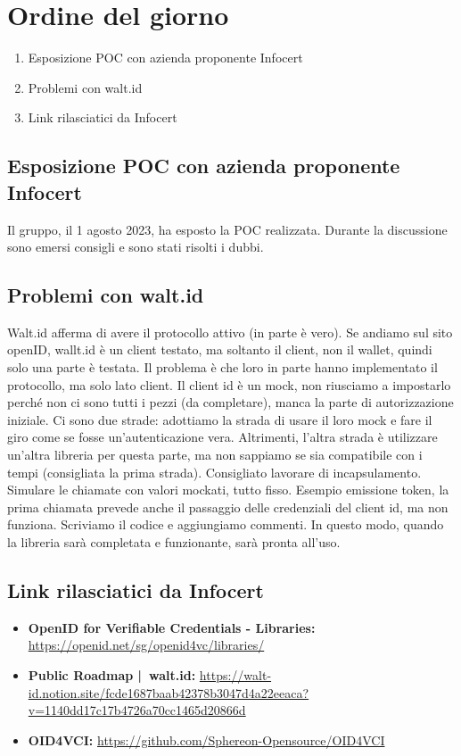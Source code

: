 \section{Ordine del giorno}
\begin{enumerate}
\item Esposizione POC con azienda proponente Infocert
\item Problemi con walt.id
\item Link rilasciatici da Infocert
\end{enumerate}

\subsection{Esposizione POC con azienda proponente Infocert} 
Il gruppo, il 1 agosto 2023, ha esposto la POC realizzata. Durante la discussione sono emersi consigli e sono stati risolti i dubbi.




\subsection{Problemi con walt.id}
Walt.id afferma di avere il protocollo attivo (in parte è vero).
Se andiamo sul sito openID, wallt.id è un client testato, ma soltanto il client, non il wallet, quindi solo una parte è testata.
Il problema è che loro in parte hanno implementato il protocollo, ma solo lato client.
Il client id è un mock, non riusciamo a impostarlo perché non ci sono tutti i pezzi (da completare), manca la parte di autorizzazione iniziale.
Ci sono due strade: adottiamo la strada di usare il loro mock e fare il giro come se fosse un'autenticazione vera.
Altrimenti, l'altra strada è utilizzare un'altra libreria per questa parte, ma non sappiamo se sia compatibile con i tempi (consigliata la prima strada).
Consigliato lavorare di incapsulamento.
Simulare le chiamate con valori mockati, tutto fisso. Esempio emissione token, la prima chiamata prevede anche il passaggio delle credenziali del client id, ma non funziona.
Scriviamo il codice e aggiungiamo commenti. In questo modo, quando la libreria sarà completata e funzionante, sarà pronta all'uso.

\subsection{Link rilasciatici da Infocert}
\begin{itemize}
\item \textbf{OpenID for Verifiable Credentials - Libraries:} \url{https://openid.net/sg/openid4vc/libraries/}
\item \textbf{Public Roadmap | walt.id:} \url{https://walt-id.notion.site/fcde1687baab42378b3047d4a22eeaca?v=1140dd17c17b4726a70cc1465d20866d}
\item \textbf{OID4VCI:} \url{https://github.com/Sphereon-Opensource/OID4VCI}
\end{itemize}
